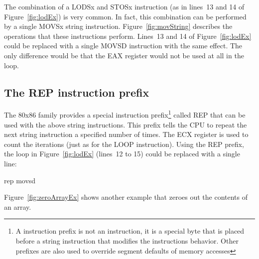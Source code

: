 The combination of a {\code LODSx} and {\code STOSx} instruction (as in
lines~13 and 14 of Figure~\ref{fig:lodEx}) is very common. In fact, this
combination can be performed by a single {\code MOVSx} string instruction.
Figure~\ref{fig:movString} describes the operations that these 
instructions perform. Lines~13 and 14 of Figure~\ref{fig:lodEx} could be
replaced with a single {\code MOVSD} instruction with the same effect. The
only difference would be that the EAX register would not be used at all
in the loop.

\subsection{The {\code REP} instruction prefix}

The 80x86 family provides a special instruction prefix\footnote{A
instruction prefix is not an instruction, it is a special byte that is
placed before a string instruction that modifies the instructions
behavior. Other prefixes are also used to override segment defaults of
memory accesses} called {\code REP} that can be used with the above string
instructions. This prefix tells the CPU to repeat the next string instruction
a specified number of times. The ECX register is used to count the iterations
(just as for the {\code LOOP} instruction). Using the {\code REP} prefix, 
the loop in Figure~\ref{fig:lodEx} (lines~12 to 15) could be replaced with
a single line:
\begin{AsmCodeListing}[frame=none, numbers=none]
      rep movsd
\end{AsmCodeListing}
Figure~\ref{fig:zeroArrayEx} shows another example that zeroes out the
contents of an array.


